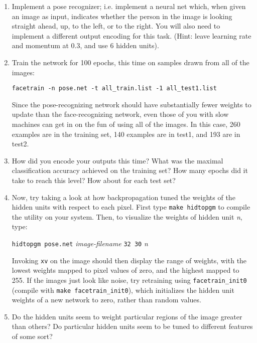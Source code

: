 \begin{enumerate}
{\tt facetrain -n face.net -T -1 straighteven\_test1.list -2 straighteven\_test2.list}

Do there seem to be any particular commonalities between the misclassified
images?

\item Implement a pose recognizer; i.e. implement a neural net which,
when given an image as input, indicates whether the person in the image
is looking straight ahead, up, to the left, or to the right.  You
will also need to implement a different output encoding for this task.
(Hint: leave learning rate and momentum at
0.3, and use 6 hidden units).

\item Train the network for 100 epochs, this time on samples drawn
from all of the images:

{\tt facetrain -n pose.net -t all\_train.list -1 all\_test1.list}

Since the pose-recognizing network should have substantially fewer
weights to update than the face-recognizing network, even those of you
with slow machines can get in on the fun of using all of the images.
In this case, 260 examples are in the training set, 140 examples are in
test1, and 193 are in test2.

\item How did you encode your outputs this time?
What was the maximal classification accuracy achieved on the
training set?  How many epochs did it take to reach this level?  How
about for each test set?

\item Now, try taking a look at how backpropagation tuned the weights
of the hidden units with respect to each pixel.  First type {\tt make
hidtopgm} to compile the utility on your system.  Then, to visualize the
weights of hidden unit {\it n}, type:

{\tt hidtopgm pose.net} {\it image-filename} {\tt 32 30} {\it n}

Invoking {\tt xv} on the image should then display the range of weights,
with the lowest weights mapped to pixel values of zero, and the highest
mapped to 255.  If the images just look like noise, try retraining using
{\tt facetrain\_init0} (compile with {\tt make facetrain\_init0}), which
initializes the hidden unit weights of a new network to zero, rather
than random values.

\item Do the hidden units seem to weight particular regions of the image
greater than others?  Do particular hidden units seem to be tuned
to different features of some sort?

\end{enumerate}

